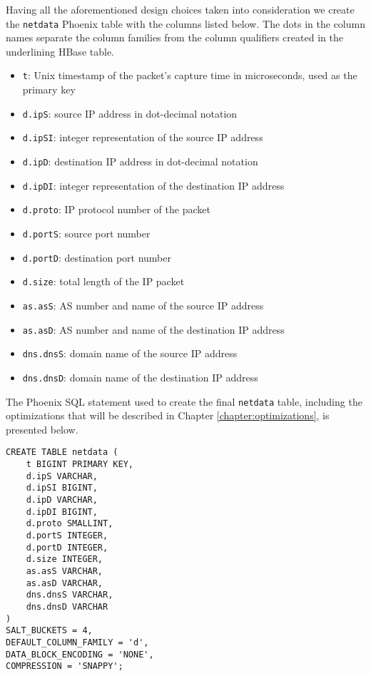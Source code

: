 Having all the aforementioned design choices taken into consideration we create the \texttt{netdata} Phoenix table with the columns listed below. The dots in the column names separate the column families from the column qualifiers created in the underlining HBase table.
\begin{itemize}
\item \texttt{t}: Unix timestamp of the packet's capture time in microseconds, used as the primary key
\item \texttt{d.ipS}: source IP address in dot-decimal notation
\item \texttt{d.ipSI}: integer representation of the source IP address
\item \texttt{d.ipD}: destination IP address in dot-decimal notation
\item \texttt{d.ipDI}: integer representation of the destination IP address
\item \texttt{d.proto}: IP protocol number of the packet
\item \texttt{d.portS}: source port number
\item \texttt{d.portD}: destination port number
\item \texttt{d.size}: total length of the IP packet
\item \texttt{as.asS}: AS number and name of the source IP address
\item \texttt{as.asD}: AS number and name of the destination IP address
\item \texttt{dns.dnsS}: domain name of the source IP address
\item \texttt{dns.dnsD}: domain name of the destination IP address
\end{itemize}

The Phoenix SQL statement used to create the final \texttt{netdata} table, including the optimizations that will be described in Chapter \ref{chapter:optimizations}, is presented below.

\begin{lstlisting}[language=PhoenixSQL]
CREATE TABLE netdata (
    t BIGINT PRIMARY KEY,
    d.ipS VARCHAR,
    d.ipSI BIGINT,
    d.ipD VARCHAR,
    d.ipDI BIGINT,
    d.proto SMALLINT,
    d.portS INTEGER,
    d.portD INTEGER,
    d.size INTEGER,
    as.asS VARCHAR,
    as.asD VARCHAR,
    dns.dnsS VARCHAR,
    dns.dnsD VARCHAR
) 
SALT_BUCKETS = 4,
DEFAULT_COLUMN_FAMILY = 'd',
DATA_BLOCK_ENCODING = 'NONE',
COMPRESSION = 'SNAPPY';
\end{lstlisting}


\cleardoublepage
